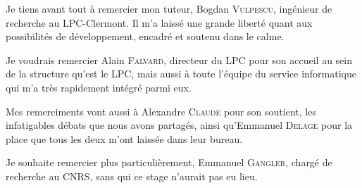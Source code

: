 
Je tiens avant tout à remercier mon tuteur, Bogdan \textsc{Vulpescu}, ingénieur de recherche au LPC-Clermont. Il m'a laissé une grande liberté quant aux possibilités de développement, encadré et soutenu dans le calme.

Je voudrais remercier Alain \textsc{Falvard}, directeur du LPC pour son accueil au sein de la structure qu'est le LPC, mais aussi à toute l'équipe du service informatique qui m'a très rapidement intégré parmi eux.

Mes remerciments vont aussi à Alexandre \textsc{Claude} pour son soutient, les infatigables débats que nous avons partagés, ainsi qu'Emmanuel \textsc{Delage} pour la place que tous les deux m'ont laissée dans leur bureau.

Je souhaite remercier plus particulièrement, Emmanuel \textsc{Gangler}, chargé de recherche au CNRS, sans qui ce stage n'aurait pas eu lieu.

